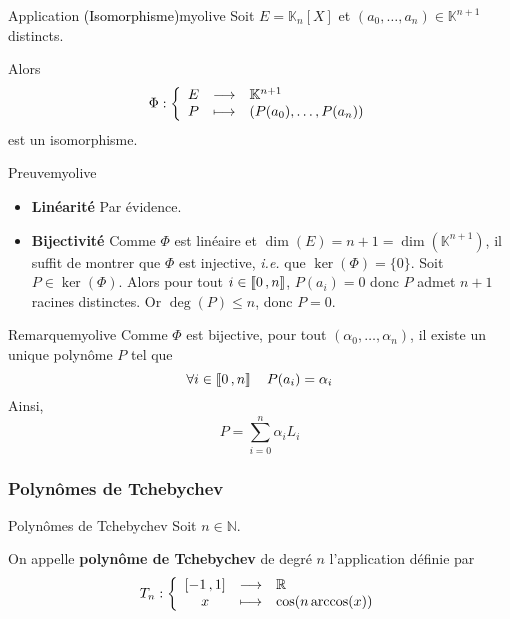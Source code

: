    \begin{omed}{Application \textcolor{black}{(Isomorphisme)}}{myolive}
        Soit $E = \mathbb{K}_n[X]$ et $(a_0,\ldots,a_n) \in \mathbb{K}^{n+1}$ distincts.

        Alors 
        \[ \fonction{\Phi}{E}{\mathbb{K}^{n+1}}{P}{\left(P(a_0),\ldots,P(a_n)\right)} \]  
        est un isomorphisme.
    \end{omed}

    \begin{demo}{Preuve}{myolive}
        \begin{itemize}
            \item \textbf{Linéarité} \quad Par évidence.
            \item \textbf{Bijectivité} \quad Comme $\Phi$ est linéaire et $\dim(E) = n+1 = \dim(\mathbb{K}^{n+1})$, il suffit de montrer que $\Phi$ est injective, \textit{i.e.} que $\ker(\Phi) = \{0\}$.
            Soit $P \in \ker(\Phi)$. Alors pour tout $i \in \left\llbracket 0 \, , n \right\rrbracket$, $P(a_i) = 0$ donc $P$ admet $n+1$ racines distinctes. Or $\deg(P) \leq n$, donc $P = 0$.
        \end{itemize}
    \end{demo}

    \begin{omed}{Remarque}{myolive}
        Comme $\Phi$ est bijective, pour tout $(\alpha_0,\ldots,\alpha_n)$, il existe un unique polynôme $P$ tel que 
        \[ \forall i \in \left\llbracket 0 \, , n \right\rrbracket \quad P(a_i) = \alpha_i \]  
        Ainsi, 
        \[ P = \sum_{i=0}^{n} \alpha_i L_i \]  
    \end{omed}

    \subsubsection{Polynômes de Tchebychev}

    \begin{defi}{Polynômes de Tchebychev}{}
        Soit $n \in \mathbb{N}$. 

        On appelle \textbf{polynôme de Tchebychev} de degré $n$ l’application définie par 
        \[ \fonction{T_n}{\intervalleFF{-1}{1}}{\mathbb{R}}{x}{\cos(n \arccos(x))} \] 
    \end{defi}

